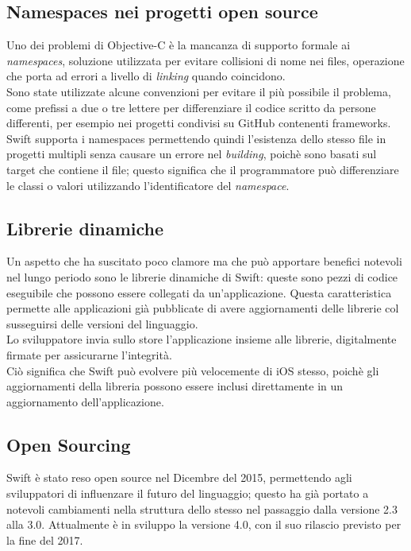 \subsection{Namespaces nei progetti open source}
Uno dei problemi di Objective-C è la mancanza di supporto formale ai \textit{namespaces}, soluzione utilizzata per evitare collisioni di nome nei files, operazione che porta ad errori a livello di \textit{linking} quando coincidono.\\Sono state utilizzate alcune convenzioni per evitare il più possibile il problema, come prefissi a due o tre lettere per differenziare il codice scritto da persone differenti, per esempio nei progetti condivisi su GitHub contenenti frameworks.\\
Swift supporta i namespaces permettendo quindi l'esistenza dello stesso file in progetti multipli senza causare un errore nel \textit{building}, poichè sono basati sul target che contiene il file; questo significa che il programmatore può differenziare le classi o valori utilizzando l'identificatore del \textit{namespace}.\\
\subsection{Librerie dinamiche}
Un aspetto che ha suscitato poco clamore ma che può apportare benefici notevoli nel lungo periodo sono le librerie dinamiche di Swift: queste sono pezzi di codice eseguibile che possono essere collegati da un'applicazione. Questa caratteristica permette alle applicazioni già pubblicate di avere aggiornamenti delle librerie col susseguirsi delle versioni del linguaggio.\\Lo sviluppatore invia sullo store l'applicazione insieme alle librerie, digitalmente firmate per assicurarne l'integrità.\\Ciò significa che Swift può evolvere più velocemente di iOS stesso, poichè gli aggiornamenti della libreria possono essere inclusi direttamente in un aggiornamento dell'applicazione.\\
\subsection{Open Sourcing}
Swift è stato reso open source nel Dicembre del 2015, permettendo agli sviluppatori di influenzare il futuro del linguaggio; questo ha già portato a notevoli cambiamenti nella struttura dello stesso nel passaggio dalla versione 2.3 alla 3.0. Attualmente è in sviluppo la versione 4.0, con il suo rilascio previsto per la fine del 2017.\newpage
